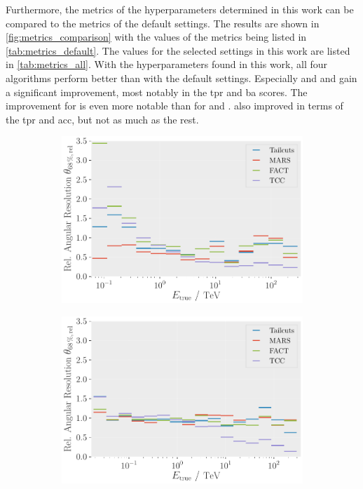 Furthermore, the metrics of the hyperparameters determined in this work can be compared to the
metrics of the default settings. The results are shown in \autoref{fig:metrics_comparison} with the
values of the metrics being listed in \autoref{tab:metrics_default}. The values for the selected
settings in this work are listed in \autoref{tab:metrics_all}.
With the hyperparameters found in this work, all four algorithms perform better than with the default
settings. Especially \tcc{} and \tailcuts{} and \mars{} gain a significant improvement, most notably in the \gls{tpr} and
\gls{ba} scores. The improvement for \tcc{} is even more notable than for \mars{} and \tailcuts{}.
\fact{} also improved in terms of the \gls{tpr} and \gls{acc}, but not as much as the rest.

\begin{figure}
    \centering
    \begin{subfigure}[t]{0.45\textwidth}
        \centering
        \includegraphics[width=\textwidth]{plots/ar_aeff/Rel_AR_0.10_0.15_base.pdf}
    \end{subfigure}
    \hfill
    \begin{subfigure}[t]{0.45\textwidth}
        \centering
        \includegraphics[width=\textwidth]{plots/ar_aeff/Rel_AR_0.40_0.45_base.pdf}

\end{subfigure}
\end{figure}
